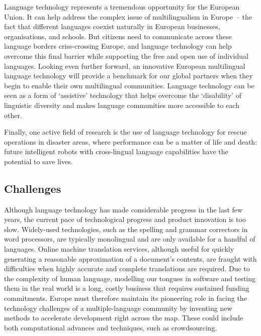\begin{multicols}{2}
Language technology represents a tremendous opportunity for the European Union.  It can help address the complex issue of multilingualism in Europe~-- the fact that different languages coexist naturally in European businesses, organisations, and schools.  But citizens need to communicate across these language borders criss-crossing Europe, and language technology can help overcome this final barrier while supporting the free and open use of individual languages.  Looking even further forward, an innovative European multilingual language technology will provide a benchmark for our global partners when they begin to enable their own multilingual communities.  Language technology can be seen as a form of `assistive' technology that helps overcome the `disability' of linguistic diversity and makes language communities more accessible to each other.


Finally, one active field of research is the use of language technology for rescue operations in disaster areas, where performance can be a matter of life and death: future intelligent robots with cross-lingual language capabilities have the potential to save lives.

\subsection[Challenges Facing Language Technology]{Challenges}

Although language technology has made considerable progress in the last few years, the current pace of technological progress and product innovation is too slow.  Widely-used technologies, such as the spelling and grammar correctors in word processors, are typically monolingual and are only available for a handful of languages.  Online machine translation services, although useful for quickly generating a reasonable approximation of a document's contents, are fraught with difficulties when highly accurate and complete translations are required.  Due to the complexity of human language, modelling our tongues in software and testing them in the real world is a long, costly business that requires sustained funding commitments.  Europe must therefore maintain its pioneering role in facing the technology challenges of a multiple-language community by inventing new methods to accelerate development right across the map.  These could include both computational advances and techniques, such as crowdsourcing.


\end{multicols}
